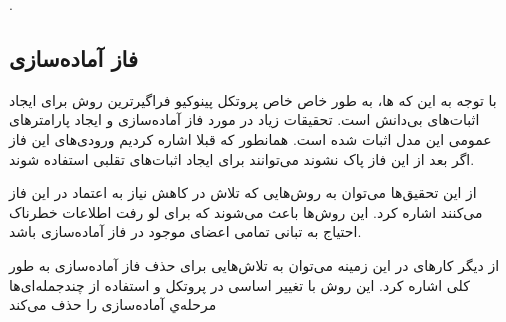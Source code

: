 . 
\subsection{فاز آماده‌سازی}
با توجه به این که 
‌ها، به طور خاص خاص پروتکل پینوکیو
فراگیرترین روش برای ایجاد اثبات‌های بی‌دانش است. تحقیقات زیاد در مورد فاز آماده‌سازی و ایجاد پارامترهای عمومی این مدل اثبات شده است. همانطور که قبلا اشاره کردیم ورودی‌های این فاز اگر بعد از این فاز پاک نشوند می‌توانند برای ایجاد اثبات‌های تقلبی استفاده شوند.
\par
از این تحقیق‌ها می‌توان به روش‌هایی
\cite{znsetup}
 که تلاش در کاهش نیاز به اعتماد در این فاز می‌کنند اشاره کرد. این روش‌ها باعث می‌شوند که برای لو رفت اطلاعات خطرناک احتیاج به تبانی تمامی اعضای موجود در فاز آماده‌سازی باشد.
 \par
 از دیگر کارهای در این زمینه می‌توان به تلاش‌هایی برای حذف فاز آماده‌سازی به طور کلی اشاره کرد. این روش‌ با تغییر اساسی در پروتکل و استفاده از چندجمله‌ای‌ها 
 \cite{nosetup}
 مرحله‌ي آماده‌سازی را حذف می‌کند















